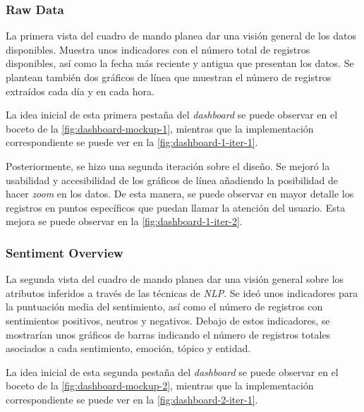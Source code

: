\subsubsection{Raw Data}

La primera vista del cuadro de mando planea dar una visión general de los datos disponibles. Muestra unos indicadores con el número total de registros disponibles, así como la fecha más reciente y antigua que presentan los datos. Se plantean también dos gráficos de línea que muestran el número de registros extraídos cada día y en cada hora.

La idea inicial de esta primera pestaña del \textit{dashboard} se puede observar en el boceto de la \autoref{fig:dashboard-mockup-1}, mientras que la implementación correspondiente se puede ver en la \autoref{fig:dashboard-1-iter-1}.



Posteriormente, se hizo una segunda iteración sobre el diseño. Se mejoró la usabilidad y accesibilidad de los gráficos de línea añadiendo la posibilidad de hacer \textit{zoom} en los datos. De esta manera, se puede observar en mayor detalle los registros en puntos específicos que puedan llamar la atención del usuario. Esta mejora se puede observar en la \autoref{fig:dashboard-1-iter-2}.


\subsubsection{Sentiment Overview}

La segunda vista del cuadro de mando planea dar una visión general sobre los atributos inferidos a través de las técnicas de \textit{NLP}. Se ideó unos indicadores para la puntuación media del sentimiento, así como el número de registros con sentimientos positivos, neutros y negativos. Debajo de estos indicadores, se mostrarían unos gráficos de barras indicando el número de registros totales asociados a cada sentimiento, emoción, tópico y entidad.

La idea inicial de esta segunda pestaña del \textit{dashboard} se puede observar en el boceto de la \autoref{fig:dashboard-mockup-2}, mientras que la implementación correspondiente se puede ver en la \autoref{fig:dashboard-2-iter-1}.

